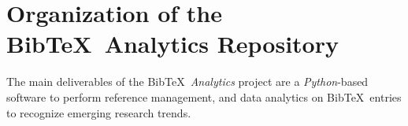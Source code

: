 









\chapter{Organization of the {\sc Bib}\TeX\ Analytics Repository}
\label{chp:OrganizationOfTheBibTeXAnalyticsRepository}


The main deliverables of the {\sc Bib}\TeX\ {\it Analytics} project are a {\it Python}-based software to perform reference management, and data analytics on {\sc Bib}\TeX\ entries to recognize emerging research trends. \\


